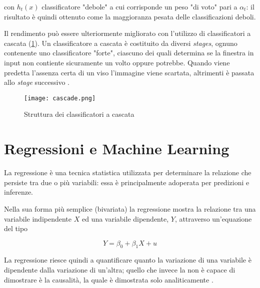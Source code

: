 con $h_t(x)$ classificatore "debole" a cui corrisponde un peso "di voto" pari a $\alpha_t$:
il risultato è quindi ottenuto come la maggioranza pesata delle classificazioni deboli.

\medskip

Il rendimento può essere ulteriormente migliorato con l'utilizzo di classificatori a cascata 
(\ref{fig:cascade}). Un classificatore a cascata è costituito da diversi \textit{stages}, 
ognuno contenente uno classificatore "forte", ciascuno dei quali determina se la finestra in 
input non contiente sicuramente un volto oppure potrebbe. Quando viene predetta l'assenza 
certa di un viso l'immagine viene scartata, altrimenti è passata allo \textit{stage} successivo 
\cite{Datta2015}.

\begin{figure}
    \begin{small}
        \begin{center}
            \texttt{[image: cascade.png]}
        \end{center}
        \caption{Struttura dei classificatori a cascata \cite{Datta2015}}
        \label{fig:cascade}
    \end{small}
\end{figure}

\newpage

\section{Regressioni e Machine Learning}
\label{section:regression_ml}

La regressione è una tecnica statistica utilizzata per determinare la relazione che persiste tra
due o più variabili: essa è principalmente adoperata per predizioni e inferenze.

Nella sua forma più semplice (bivariata) la regressione mostra la relazione tra una variabile 
indipendente $X$ ed una variabile dipendente, $Y$, attraverso un'equazione del tipo

\begin{equation}
    Y = \beta_0 + \beta_1 X + u
    \label{eq:biv_regression}
\end{equation}

La regressione riesce quindi a quantificare quanto la variazione di una variabile è dipendente 
dalla variazione di un'altra; quello che invece la non è capace di dimostrare è la causalità, 
la quale è dimostrata solo analiticamente \cite{campbell2008introduction}.

